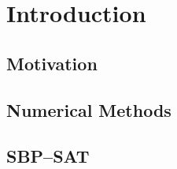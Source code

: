 \section{Introduction}

\subsection{Motivation}

\subsection{Numerical Methods}

\subsection{SBP--SAT}

